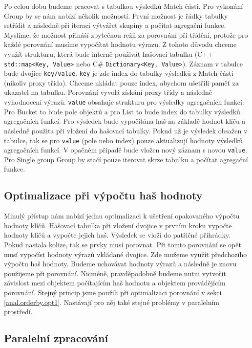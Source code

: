 Po celou dobu budeme pracovat s tabulkou výsledků Match části.
Pro vykonání Group by se nám nabízí několik možností.
První možnost je řádky tabulky setřídit a následně při iteraci výtvářet skupiny a počítat agregační funkce.
Myslíme, že možnost přináší zbytečnou režii za porovnání při třídění, protože pro každé porovnání musíme vypočítat hodnotu výrazu.
Z tohoto důvodu chceme využít strukturu, která bude interně použivát hašovací tabulku (C++ \texttt{std::map<Key, Value>} nebo C\#  \texttt{Dictionary<Key, Value>}).
Záznam v tabulce bude dvojice \texttt{key/value}. 
\texttt{key} je zde index do tabulky výsledků z Match části (nikoliv proxy třída).
Chceme ukládat pouze index, abychom ušetřili paměť za ukazatel na tabulku.
Porovnání vyvolá získání proxy třídy a následně vyhodnocení výrazů.
\texttt{value} obsahuje strukturu pro výsledky agregačních funkcí.
Pro Bucket to bude pole objektů a pro List to bude index do tabulky výsledků agregačních funkcí.
Pro výsledek bude vypočítána haš na základě hodnot klíču a následně použita při vložení do hašovací tabulky.
Pokud už je výsledek obsažen v tabulce, tak se pro \texttt{value} (pole nebo index) pouze aktualizují hodnoty výsledků agregačních funkcí.
V opačném případě bude vložen nový záznam s novou \texttt{value}.
Pro Single group Group by stačí pouze iterovat skrze tabulku a počítat agregační funkce.

\subsection{Optimalizace při výpočtu haš hodnoty} \label{anal.groupby.opt1}

Minulý přístup nám nabízí jednu optimalizaci k ušetření opakovaného výpočtu hodnoty klíčů.
Hašovací tabulka při vložení dvojice v prvním kroku vypočte hodnoty klíčů a vypočte jejich haš.
Výsledek se vloží do patřičné přihrádky.
Pokud nastala kolize, tak se prvky musí porovnat.
Při tomto porovnání se opět musí vypočíst hodnoty výrazů vkládané dvojice.
Zde mužeme využít předchozího výpočtu haš hodnoty.
Budeme uchovávat hodnoty výrazů a následně je znovu použijeme při porovnání.
Nicméně, pravděpodobně budeme nutni vytvořit závislost mezi objektem počítajícím haš hodnotu a objektem provádějícím porovnání.
Stejný princip jsme použili při optimalizaci porovnání v sekci \ref{anal.orderby.opt1}.
Nastávají pro něj také stejné problémy v paralelním prostředí.

\subsection{Paralelní zpracování} \label{anal.groupby.paralel}

